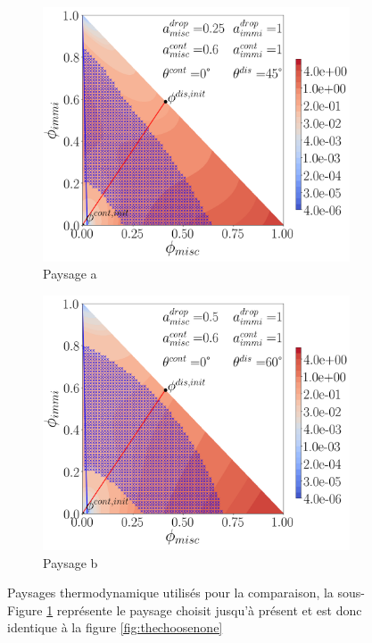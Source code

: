 \begin{figure}[H]
	\centering
	\begin{subfigure}[H]{0.45\textwidth}
		\centering
		\includegraphics[width=1.1\textwidth]{figure/Paysage_ecriture1.png}
		\caption{Paysage a}
		\label{fig:paysage1}
	\end{subfigure}
	\hfill
	\begin{subfigure}[H]{0.45\textwidth}
		\centering
		\includegraphics[width=1.1\textwidth]{figure/paysagetocompare.png}
		\caption{Paysage b}
		\label{fig:paysage2}
	\end{subfigure}
	\caption{Paysages thermodynamique utilisés pour la comparaison, la sous-Figure \ref{fig:paysage1} représente le paysage choisit jusqu’à présent et est donc identique à la figure \ref{fig:thechoosenone}}
	\label{fig:comparelandscape}
\end{figure}
